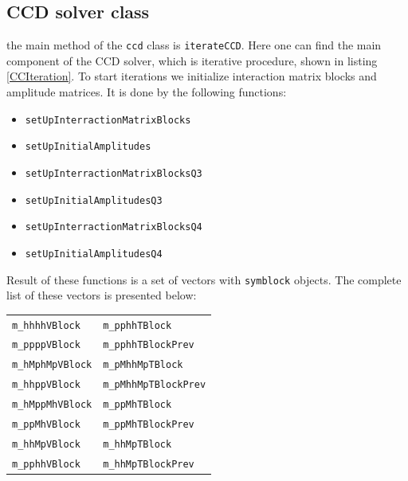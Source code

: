 \documentclass[twoside,english]{uiofysmaster}
\newcommand{\classname}[1]{\texttt{#1}}
\begin{document}
\subsection{CCD solver class}\label{ccdsolversec}

the main method of the \classname{ccd} class is \classname{iterateCCD}. Here one can find the main component of the CCD solver, which is iterative procedure, shown in listing \ref{CCIteration}.
To start iterations we initialize interaction matrix blocks and amplitude matrices. It is done by the following functions:
\begin{itemize}    
\item    \classname{setUpInterractionMatrixBlocks}
\item    \classname{setUpInitialAmplitudes}
\item    \classname{setUpInterractionMatrixBlocksQ3}
\item    \classname{setUpInitialAmplitudesQ3}
\item    \classname{setUpInterractionMatrixBlocksQ4}
\item    \classname{setUpInitialAmplitudesQ4}
\end{itemize}

Result of these functions is a set of vectors with \classname{symblock} objects. The complete list of these vectors is presented below:


\begin{table}[h!]

	\begin{center}
		\begin{tabular}{ll}
			\classname{m_hhhhVBlock}	& \classname{m_pphhTBlock} \\ 
			\classname{m_ppppVBlock}	& \classname{m_pphhTBlockPrev} \\ 
			\classname{m_hMphMpVBlock}	& \classname{m_pMhhMpTBlock} \\ 
			\classname{m_hhppVBlock}	&  \classname{m_pMhhMpTBlockPrev}\\ 
			\classname{m_hMppMhVBlock}	& \classname{m_ppMhTBlock} \\ 
			\classname{m_ppMhVBlock}	& \classname{m_ppMhTBlockPrev} \\ 
			\classname{m_hhMpVBlock}	&  \classname{m_hhMpTBlock}\\ 
			\classname{m_pphhVBlock}	& \classname{m_hhMpTBlockPrev}\\
	\end{tabular} 
	\end{center}
\end{table}
\end{document}
